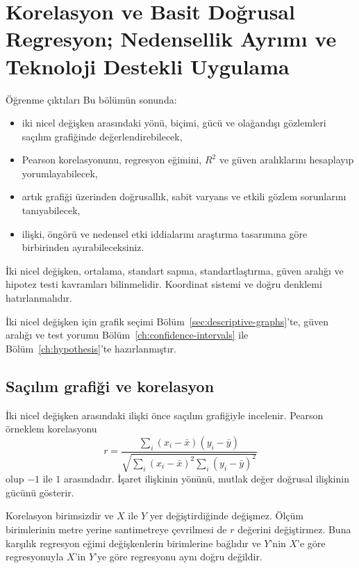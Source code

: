 \chapter[Korelasyon, Regresyon ve Uygulama]{Korelasyon ve Basit Doğrusal Regresyon; Nedensellik Ayrımı ve Teknoloji Destekli Uygulama}
\label{ch:correlation-regression}

\begin{prismbox}[PrismLight]{Öğrenme çıktıları}
Bu bölümün sonunda:
\begin{itemize}
  \item iki nicel değişken arasındaki yönü, biçimi, gücü ve olağandışı gözlemleri saçılım grafiğinde değerlendirebilecek,
  \item Pearson korelasyonunu, regresyon eğimini, $R^2$ ve güven aralıklarını hesaplayıp yorumlayabilecek,
  \item artık grafiği üzerinden doğrusallık, sabit varyans ve etkili gözlem sorunlarını tanıyabilecek,
  \item ilişki, öngörü ve nedensel etki iddialarını araştırma tasarımına göre birbirinden ayırabileceksiniz.
\end{itemize}
\end{prismbox}

\begin{prerequisitebox}
İki nicel değişken, ortalama, standart sapma, standartlaştırma, güven aralığı
ve hipotez testi kavramları bilinmelidir. Koordinat sistemi ve doğru denklemi
hatırlanmalıdır.
\end{prerequisitebox}

İki nicel değişken için grafik seçimi Bölüm~\ref{sec:descriptive-graphs}'te,
güven aralığı ve test yorumu Bölüm~\ref{ch:confidence-intervals} ile
Bölüm~\ref{ch:hypothesis}'te hazırlanmıştır.

\section{Saçılım grafiği ve korelasyon}

İki nicel değişken arasındaki ilişki önce saçılım grafiğiyle incelenir.
Pearson örneklem korelasyonu
\[
r=\frac{\sum_i(x_i-\bar x)(y_i-\bar y)}
{\sqrt{\sum_i(x_i-\bar x)^2\sum_i(y_i-\bar y)^2}}
\]
olup $-1$ ile $1$ arasındadır. İşaret ilişkinin yönünü, mutlak değer doğrusal
ilişkinin gücünü gösterir.

Korelasyon birimsizdir ve $X$ ile $Y$ yer değiştirdiğinde değişmez. Ölçüm
birimlerinin metre yerine santimetreye çevrilmesi de $r$ değerini değiştirmez.
Buna karşılık regresyon eğimi değişkenlerin birimlerine bağlıdır ve $Y$'nin
$X$'e göre regresyonuyla $X$'in $Y$'ye göre regresyonu aynı doğru değildir.

